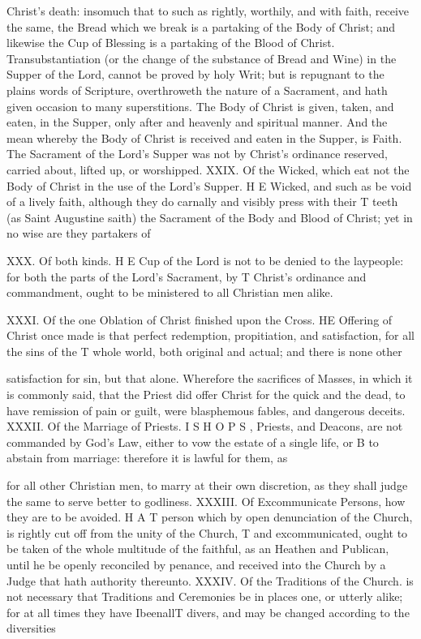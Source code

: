 Christ’s death: insomuch that to such as rightly, worthily, and with faith, receive the same, the Bread which we break is a partaking of the Body of Christ; and likewise the Cup of Blessing is a partaking of the Blood of Christ. Transubstantiation (or the change of the substance of Bread and Wine) in the Supper of the Lord, cannot be proved by holy Writ; but is repugnant to the plains words of Scripture, overthroweth the nature of a Sacrament, and hath given occasion to many superstitions. The Body of Christ is given, taken, and eaten, in the Supper, only after and heavenly and spiritual manner. And the mean whereby the Body of Christ is received and eaten in the Supper, is Faith. The Sacrament of the Lord’s Supper was not by Christ’s ordinance reserved, carried about, lifted up, or worshipped. XXIX. Of the Wicked, which eat not the Body of Christ in the use of the Lord’s Supper. H E Wicked, and such as be void of a lively faith, although they do carnally and visibly press with their T teeth (as Saint Augustine saith) the Sacrament of the Body and Blood of Christ; yet in no wise are they partakers of

XXX. Of both kinds. H E Cup of the Lord is not to be denied to the laypeople: for both the parts of the Lord’s Sacrament, by T Christ’s ordinance and commandment, ought to be ministered to all Christian men alike.

XXXI. Of the one Oblation of Christ finished upon the Cross. HE Offering of Christ once made is that perfect redemption, propitiation, and satisfaction, for all the sins of the T whole world, both original and actual; and there is none other

satisfaction for sin, but that alone. Wherefore the sacrifices of Masses, in which it is commonly said, that the Priest did offer Christ for the quick and the dead, to have remission of pain or guilt, were blasphemous fables, and dangerous deceits. XXXII. Of the Marriage of Priests. I S H O P S , Priests, and Deacons, are not commanded by God’s Law, either to vow the estate of a single life, or B to abstain from marriage: therefore it is lawful for them, as

for all other Christian men, to marry at their own discretion, as they shall judge the same to serve better to godliness. XXXIII. Of Excommunicate Persons, how they are to be avoided. H A T person which by open denunciation of the Church, is rightly cut off from the unity of the Church, T and excommunicated, ought to be taken of the whole multitude of the faithful, as an Heathen and Publican, until he be openly reconciled by penance, and received into the Church by a Judge that hath authority thereunto. XXXIV. Of the Traditions of the Church. is not necessary that Traditions and Ceremonies be in places one, or utterly alike; for at all times they have IbeenallT divers, and may be changed according to the diversities

